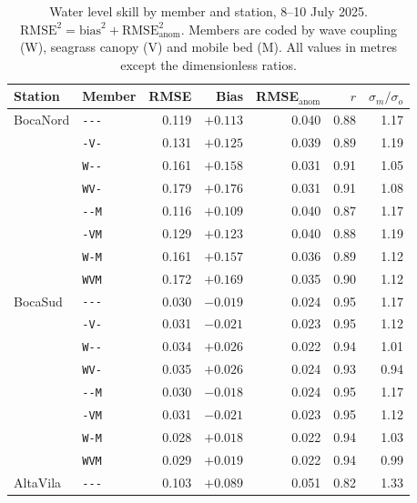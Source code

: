 \begin{table}[H]
  \centering
  \caption{Water level skill by member and station, 8--10 July 2025.
  $\mathrm{RMSE}^2 = \mathrm{bias}^2 + \mathrm{RMSE}_{\mathrm{anom}}^2$. Members
  are coded by wave coupling (W), seagrass canopy (V) and mobile bed (M).
  All values in metres except the dimensionless ratios.}
  \label{tab:wl}
  \begin{tabular}{llrrrrr}
    \toprule
    Station & Member & RMSE & Bias & RMSE$_{\mathrm{anom}}$ & $r$ & $\sigma_m/\sigma_o$ \\
    \midrule
    BocaNord & \texttt{{-}{-}{-}} & 0.119 & $+0.113$ & 0.040 & 0.88 & 1.17 \\
             & \texttt{{-}V{-}}   & 0.131 & $+0.125$ & 0.039 & 0.89 & 1.19 \\
             & \texttt{W{-}{-}}   & 0.161 & $+0.158$ & 0.031 & 0.91 & 1.05 \\
             & \texttt{WV{-}}     & 0.179 & $+0.176$ & 0.031 & 0.91 & 1.08 \\
             & \texttt{{-}{-}M}   & 0.116 & $+0.109$ & 0.040 & 0.87 & 1.17 \\
             & \texttt{{-}VM}     & 0.129 & $+0.123$ & 0.040 & 0.88 & 1.19 \\
             & \texttt{W{-}M}     & 0.161 & $+0.157$ & 0.036 & 0.89 & 1.12 \\
             & \texttt{WVM}       & 0.172 & $+0.169$ & 0.035 & 0.90 & 1.12 \\
    \midrule
    BocaSud  & \texttt{{-}{-}{-}} & 0.030 & $-0.019$ & 0.024 & 0.95 & 1.17 \\
             & \texttt{{-}V{-}}   & 0.031 & $-0.021$ & 0.023 & 0.95 & 1.12 \\
             & \texttt{W{-}{-}}   & 0.034 & $+0.026$ & 0.022 & 0.94 & 1.01 \\
             & \texttt{WV{-}}     & 0.035 & $+0.026$ & 0.024 & 0.93 & 0.94 \\
             & \texttt{{-}{-}M}   & 0.030 & $-0.018$ & 0.024 & 0.95 & 1.17 \\
             & \texttt{{-}VM}     & 0.031 & $-0.021$ & 0.023 & 0.95 & 1.12 \\
             & \texttt{W{-}M}     & 0.028 & $+0.018$ & 0.022 & 0.94 & 1.03 \\
             & \texttt{WVM}       & 0.029 & $+0.019$ & 0.022 & 0.94 & 0.99 \\
    \midrule
    AltaVila & \texttt{{-}{-}{-}} & 0.103 & $+0.089$ & 0.051 & 0.82 & 1.33 \\

\end{tabular}
\end{table}
